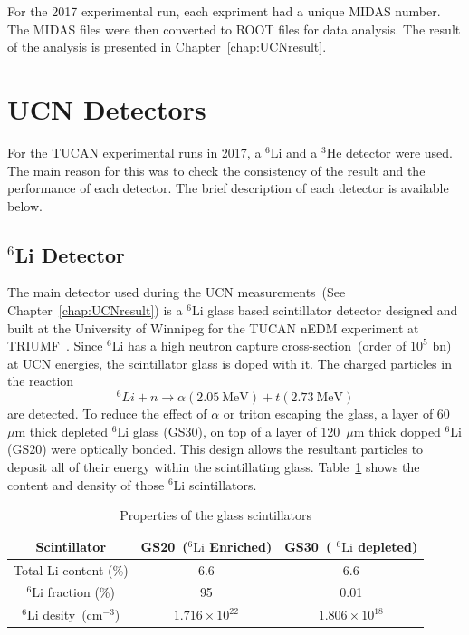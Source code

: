 For the 2017 experimental run, each expriment had a unique MIDAS
number. The MIDAS files were then converted to ROOT files for data
analysis. The result of the analysis is presented in
Chapter~\ref{chap:UCNresult}.

\section{UCN Detectors\label{sec:detectors}}
For the TUCAN experimental runs in 2017, a $^6$Li and a $^3$He
detector were used. The main reason for this was to check the
consistency of the result and the performance of each detector. The
brief description of each detector is available below.

\subsection{$^6$Li Detector\label{sec:Li6detector}}
The main detector used during the UCN measurements~(See
Chapter~\ref{chap:UCNresult}) is a $^6\mathrm{Li}$ glass based scintillator
detector designed and built at the University of Winnipeg for the
TUCAN nEDM experiment at
TRIUMF~\cite{jamieson2017characterization}. Since $^6\mathrm{Li}$ has a high
neutron capture cross-section~(order of $10^5$ bn) at UCN energies,
the scintillator glass is doped with it. The charged particles in the
reaction
\begin{equation}
^6Li + n \rightarrow \alpha (2.05~\mathrm{MeV}) + t (2.73~\mathrm{MeV})
\end{equation}
are detected. To reduce the effect of $\alpha$ or triton escaping the
glass, a layer of 60~$\mu$m thick depleted $^6\mathrm{Li}$ glass (GS30), on top
of a layer of 120~$\mu$m thick dopped $^6\mathrm{Li}$ (GS20) were optically
bonded. This design allows the resultant particles to deposit all of
their energy within the scintillating
glass. Table~\ref{tab:scintillator} shows the content and density of
those $^6\mathrm{Li}$ scintillators.

\begin{table}[h!]
  \centering
  \label{tab:scintillator}
  \begin{tabular}{|c|c|c|}
    \hline
    Scintillator & GS20~($^6\mathrm{Li}$ Enriched) & GS30~( $^6\mathrm{Li}$ depleted) \\
    \hline
    Total Li content (\%) & 6.6 & 6.6 \\
    \hline
    $^6\mathrm{Li}$ fraction (\%) & 95 & 0.01 \\
    \hline
    $^6\mathrm{Li}$ desity~(cm$^{-3}$) & $1.716 \times 10^{22}$ & $1.806 \times 10^{18}$ \\
    \hline
  \end{tabular}
  \caption{Properties of the glass scintillators}
\end{table}


